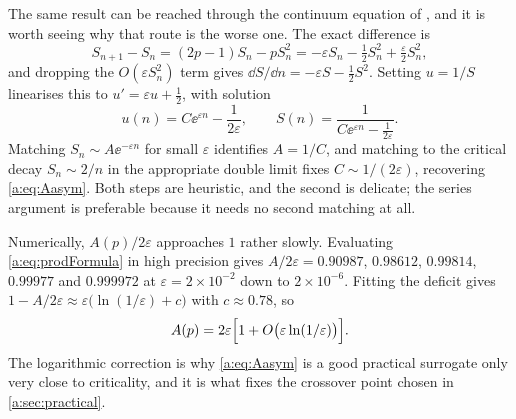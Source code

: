 The same result can be reached through the continuum equation of
\ChM, and it is worth seeing why that route is the worse one. The
exact difference is
\begin{equation*}
S_{n+1}-S_n = (2p-1)S_n - pS_n^2
= -\varepsilon S_n - \tfrac12S_n^2 + \tfrac{\varepsilon}{2}S_n^2 ,
\end{equation*}
and dropping the $O(\varepsilon S_n^2)$ term gives
$\dd S/\dd n = -\varepsilon S-\tfrac12S^2$. Setting $u=1/S$ linearises this to
$u' = \varepsilon u+\tfrac12$, with solution
\begin{equation*}
u(n) = C\ee^{\varepsilon n} - \frac{1}{2\varepsilon},
\qquad
S(n) = \frac{1}{C\ee^{\varepsilon n}-\frac{1}{2\varepsilon}} .
\end{equation*}
Matching $S_n\sim A\ee^{-\varepsilon n}$ for small $\varepsilon$ identifies
$A=1/C$, and matching to the critical decay $S_n\sim2/n$ in the appropriate double
limit fixes $C\sim1/(2\varepsilon)$, recovering \cref{a:eq:Aasym}. Both steps are
heuristic, and the second is delicate; the series argument is preferable because it
needs no second matching at all.

\begin{remark}
\label{a:rem:rate}
Numerically, $A(p)/2\varepsilon$ approaches $1$ rather slowly. Evaluating
\cref{a:eq:prodFormula} in high precision gives $A/2\varepsilon = 0.90987$,
$0.98612$, $0.99814$, $0.99977$ and $0.999972$ at $\varepsilon=2\times10^{-2}$ down
to $2\times10^{-6}$. Fitting the deficit gives
$1-A/2\varepsilon\approx\varepsilon\bigl(\ln(1/\varepsilon)+c\bigr)$ with
$c\approx0.78$, so
\begin{equation*}
A(p) = 2\varepsilon\Bigl[1+O\bigl(\varepsilon\ln(1/\varepsilon)\bigr)\Bigr] .
\end{equation*}
The logarithmic correction is why \cref{a:eq:Aasym} is a good practical surrogate
only very close to criticality, and it is what fixes the crossover point chosen in
\cref{a:sec:practical}.
\end{remark}

